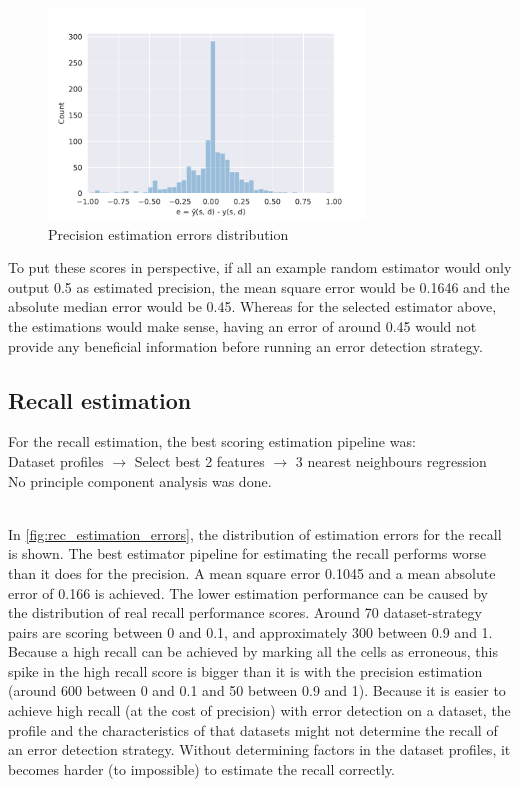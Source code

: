 \begin{figure}[h]
    \centering
    \includegraphics[width=0.75\textwidth]{thesis/Figures/RQ2/15_error_histogramcell_prec.pdf}
    \caption{Precision estimation errors distribution}
    \label{fig:prec_estimation_errors}
\end{figure}

To put these scores in perspective, if all an example random estimator would only output 0.5 as estimated precision, the mean square error would be 0.1646 and the absolute median error would be 0.45. Whereas for the selected estimator above, the estimations would make sense, having an error of around 0.45 would not provide any beneficial information before running an error detection strategy. 

\subsection{Recall estimation}
For the recall estimation, the best scoring estimation pipeline was:
~\\Dataset profiles $\rightarrow$ Select best 2 features $\rightarrow$ 3 nearest neighbours regression
\\No principle component analysis was done. 

~\\In \autoref{fig:rec_estimation_errors}, the distribution of estimation errors for the recall is shown. The best estimator pipeline for estimating the recall performs worse than it does for the precision. A mean square error 0.1045 and a mean absolute error of 0.166 is achieved. The lower estimation performance can be caused by the distribution of real recall performance scores. Around 70 dataset-strategy pairs are scoring between 0 and 0.1, and approximately 300 between 0.9 and 1. Because a high recall can be achieved by marking all the cells as erroneous, this spike in the high recall score is bigger than it is with the precision estimation (around 600 between 0 and 0.1 and 50 between 0.9 and 1). Because it is easier to achieve high recall (at the cost of precision) with error detection on a dataset, the profile and the characteristics of that datasets might not determine the recall of an error detection strategy. Without determining factors in the dataset profiles, it becomes harder (to impossible) to estimate the recall correctly.

